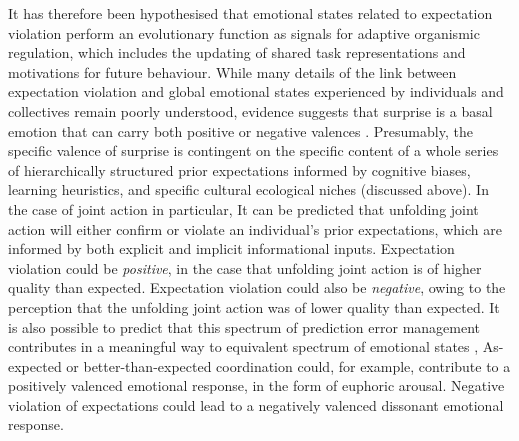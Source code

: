 \begin{mccorrection}
It has therefore been hypothesised that emotional states related to expectation violation perform an evolutionary function as signals for adaptive organismic regulation, which includes the updating of shared task representations and motivations for future behaviour\citep{Cosmides2000,Barrett2017}.  While many details of the link between expectation violation and global emotional states experienced by individuals and collectives remain poorly understood, evidence suggests that surprise is a basal emotion that can carry both positive or negative valences \citep{Ortony1990}. Presumably, the specific valence of surprise is contingent on the specific content of a whole series of hierarchically structured prior expectations informed by cognitive biases, learning heuristics, and specific cultural ecological niches (discussed above).  In the case of joint action in particular, It can be predicted that unfolding joint action will either confirm or violate an individual's prior expectations, which are informed by both explicit and implicit informational inputs.
Expectation violation could be \textit{positive}, in the case that unfolding joint action is of higher quality than expected.  Expectation violation could also be \textit{negative}, owing to the perception that the unfolding joint action was of lower quality than expected.  It is also possible to predict that this spectrum of prediction error management contributes in a meaningful way to equivalent spectrum of emotional states \citep{Pessoa2014},  As-expected or better-than-expected coordination could, for example, contribute to a positively valenced emotional response, in the form of euphoric arousal.  Negative violation of expectations could lead to a negatively valenced dissonant emotional response.
\end{mccorrection}


